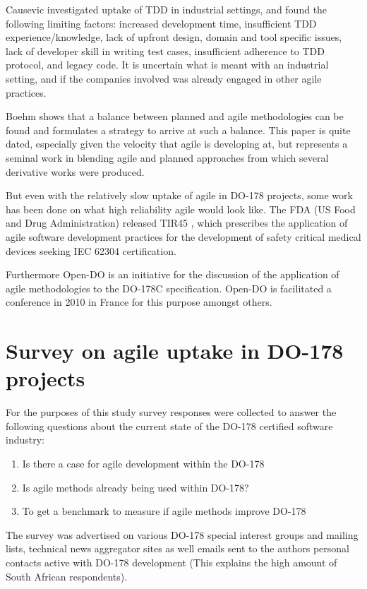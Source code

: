 \documentclass{sig-alternate-05-2015}
\begin{document}
Causevic \cite{Causevic_2011} investigated uptake of TDD in industrial settings, and found the following limiting factors: increased development time, insufficient TDD experience/knowledge, lack of upfront design, domain and tool specific issues, lack of developer skill in writing test cases, insufficient adherence to TDD protocol, and legacy code. It is uncertain what is meant with an industrial setting, and if the companies involved was already engaged in other agile practices. 
 
Boehm \cite{Boehm_2003} shows that a balance between planned and agile methodologies can be found and formulates a strategy to arrive at such a balance. This paper is quite dated, especially given the velocity that agile is developing at, but represents a seminal work in blending agile and planned approaches from which several derivative works were produced. 

But even with the relatively slow uptake of agile in DO-178 projects, some work has been done on what high reliability agile would look like. The FDA (US Food and Drug Administration) released TIR45 \cite{AAMI_TIR45_2012}, which prescribes the application of agile software development practices for the development of safety critical medical devices seeking IEC 62304 certification. 

Furthermore Open-DO \cite{OPEN-DO_2010} is an initiative for the discussion of the application of agile methodologies to the DO-178C specification. Open-DO is facilitated a conference in 2010 in France for this purpose amongst others.     

\section{Survey on agile uptake in DO-178 projects}
For the purposes of this study survey responses were collected to answer the following questions about the current state of the DO-178 certified software industry:
\begin{enumerate}
	\item Is there a case for agile development within the DO-178 %
	\item Is agile methods already being used within DO-178?
	\item To get a benchmark to measure if agile methods improve DO-178 %
\end{enumerate} 

The survey was advertised on various DO-178 special interest groups and mailing lists, technical news aggregator sites as well emails sent to the authors personal contacts active with DO-178 development (This explains the high amount of South African respondents).
\end{document}
